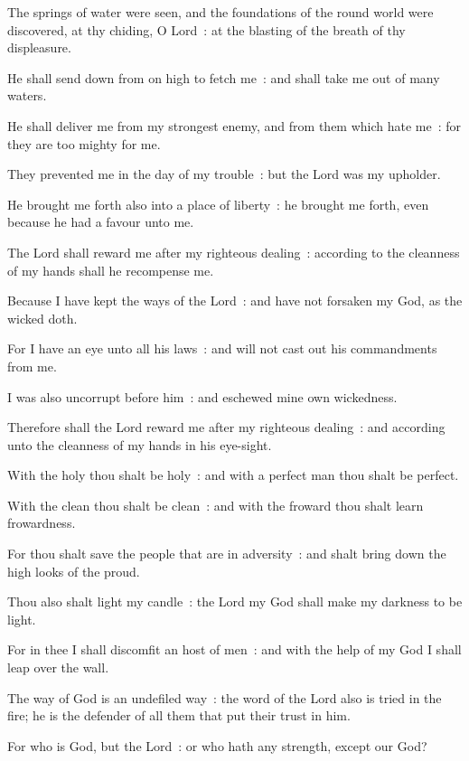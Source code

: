 The springs of water were seen, and the foundations of the round world were discovered, at thy chiding, O Lord~: at the blasting of the breath of thy displeasure.\par
{}He shall send down from on high to fetch me~: and shall take me out of many waters.\par
{}He shall deliver me from my strongest enemy, and from them which hate me~: for they are too mighty for me.\par
{}They prevented me in the day of my trouble~: but the Lord was my upholder.\par
{}He brought me forth also into a place of liberty~: he brought me forth, even because he had a favour unto me.\par
{}The Lord shall reward me after my righteous dealing~: according to the cleanness of my hands shall he recompense me.\par
{}Because I have kept the ways of the Lord~: and have not forsaken my God, as the wicked doth.\par
{}For I have an eye unto all his laws~: and will not cast out his commandments from me.\par
{}I was also uncorrupt before him~: and eschewed mine own wickedness.\par
{}Therefore shall the Lord reward me after my righteous dealing~: and according unto the cleanness of my hands in his eye-sight.\par
{}With the holy thou shalt be holy~: and with a perfect man thou shalt be perfect.\par
{}With the clean thou shalt be clean~: and with the froward thou shalt learn frowardness.\par
{}For thou shalt save the people that are in adversity~: and shalt bring down the high looks of the proud.\par
{}Thou also shalt light my candle~: the Lord my God shall make my darkness to be light.\par
{}For in thee I shall discomfit an host of men~: and with the help of my God I shall leap over the wall.\par
{}The way of God is an undefiled way~: the word of the Lord also is tried in the fire; he is the defender of all them that put their trust in him.\par
{}For who is God, but the Lord~: or who hath any strength, except our God?\par

